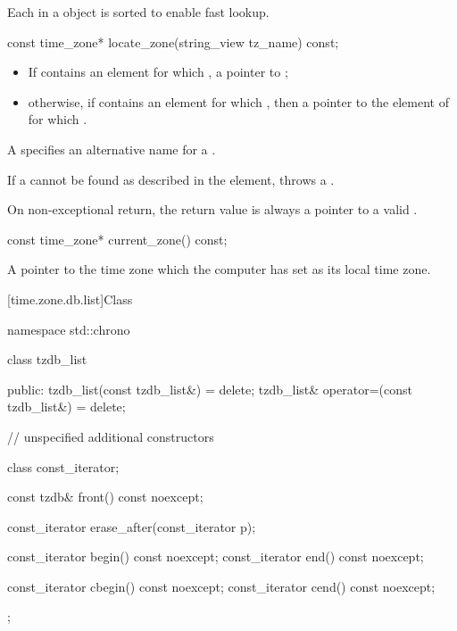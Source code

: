\pnum
Each  in a  object
is sorted to enable fast lookup.

%
\begin{itemdecl}
const time_zone* locate_zone(string_view tz_name) const;
\end{itemdecl}

\begin{itemdescr}
\pnum
\returns
\begin{itemize}
\item
If  contains an element 
for which ,
a pointer to ;
\item
otherwise,
if  contains an element 
for which ,
then a pointer to the element  of 
for which .
\end{itemize}
\begin{note}
A  specifies an alternative name for a .
\end{note}

\pnum
\throws
If a  cannot be found
as described in the \returns element,
throws a .
\begin{note}
On non-exceptional return, the return value is always a pointer to a valid .
\end{note}
\end{itemdescr}

%
\begin{itemdecl}
const time_zone* current_zone() const;
\end{itemdecl}

\begin{itemdescr}
\pnum
\returns
A pointer to the time zone which the computer has set as its local time zone.
\end{itemdescr}

[time.zone.db.list]{Class }

\begin{codeblock}
namespace std::chrono {
  class tzdb_list {
  public:
    tzdb_list(const tzdb_list&) = delete;
    tzdb_list& operator=(const tzdb_list&) = delete;

    // unspecified additional constructors

    class const_iterator;

    const tzdb& front() const noexcept;

    const_iterator erase_after(const_iterator p);

    const_iterator begin() const noexcept;
    const_iterator end()   const noexcept;

    const_iterator cbegin() const noexcept;
    const_iterator cend()   const noexcept;
  };
}
\end{codeblock}

